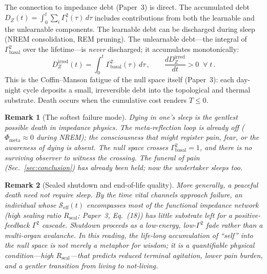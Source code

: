 \documentclass[aps,pre,twocolumn,superscriptaddress,floatfix]{revtex4-2}
\newtheorem{remark}{Remark}
\begin{document}
The connection to impedance debt (Paper~3) is direct.
The accumulated debt
$D_Z(t)=\int_0^t\sum_i\Gamma_i^2(\tau)\,d\tau$
includes contributions from both the learnable and the
unlearnable components.  The learnable debt can be
discharged during sleep (NREM consolidation, REM pruning).
The unlearnable debt---the integral of
$\Gamma_{\text{basal}}^2$ over the lifetime---is
\emph{never} discharged; it accumulates monotonically:
\begin{equation}
  D_Z^{\text{irred}}(t)
    = \int_0^t \Gamma_{\text{basal}}^2(\tau)\,d\tau\,,
  \qquad
  \frac{d D_Z^{\text{irred}}}{dt} > 0
  \;\;\forall\;t\,.
  \label{eq:irreducible-debt}
\end{equation}
This is the Coffin--Manson fatigue of the null space itself
(Paper~3): each day-night cycle deposits a small,
irreversible debt into the topological and thermal
substrate.  Death occurs when the cumulative cost
renders $T\le 0$.

\begin{remark}[The softest failure mode]
Dying in one's sleep is the gentlest possible death in
impedance physics.
The meta-reflection loop is already off
($\Phi_{\text{meta}}\approx 0$ during NREM);
the consciousness that might register pain, fear, or
the awareness of dying is absent.
The null space crosses $\Gamma_{\text{basal}}^2=1$, and
there is no surviving observer to witness the crossing.
The funeral of pain (Sec.~\ref{sec:conclusion}) has
already been held; now the undertaker sleeps too.
\end{remark}

\begin{remark}[Sealed shutdown and end-of-life quality]
\label{rem:sealed-death}
More generally, a peaceful death need not require sleep.
By the time vital channels approach failure, an individual
whose $\mathcal{S}_{\text{eff}}(t)$ encompasses most of
the functional impedance network (high sealing ratio
$R_{\text{seal}}$; Paper~3, Eq.~(18))
has little substrate left for a
positive-feedback $\Gamma^2$ cascade.
Shutdown proceeds as a low-energy, low-$\Gamma^2$ fade
rather than a multi-organ avalanche.
In this reading, the life-long accumulation of ``self''
into the null space is not merely a metaphor for wisdom;
it is a quantifiable physical condition---high
$R_{\text{seal}}$---that predicts reduced terminal
agitation, lower pain burden, and a gentler transition
from living to not-living.
\end{remark}


\end{document}
